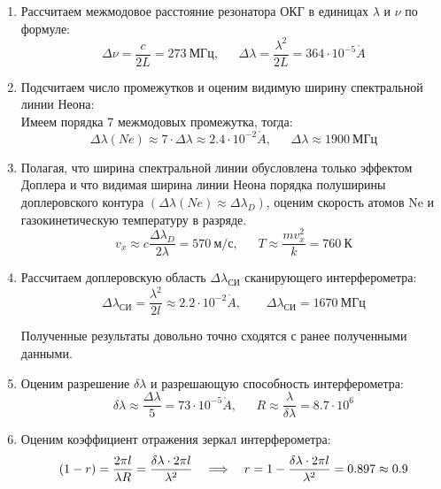 \documentclass{lab}
\renewcommand{\AA}{\ensuremath{\mathring{A}}}
\begin{document}
\begin{enumerate}
\item
Рассчитаем межмодовое расстояние резонатора ОКГ в единицах $ \lambda  $ и $ \nu  $ по формуле:
\begin{equation}
\Delta \nu = \dfrac{c}{2L} = 273~МГц, ~~~~~~~ \Delta \lambda = \dfrac{\lambda^2}{2L} = 364 \cdot 10^{-5} \AA
\end{equation}

\item 
Подсчитаем число промежутков и оценим видимую ширину спектральной линии Неона:\\
Имеем порядка 7 межмодовых промежутка, тогда:
\begin{equation}
\Delta \lambda(Ne) \approx 7 \cdot \Delta \lambda \approx 2.4 \cdot 10^{-2 } \AA, ~~~~~~~ \Delta \lambda \approx 1900 ~МГц
\end{equation}

\item
Полагая, что ширина спектральной линии обусловлена только эффектом Доплера и что видимая ширина линии Неона порядка полуширины доплеровского контура $ (\Delta \lambda (Ne) \approx \Delta \lambda_D) $, оценим скорость атомов Ne и газокинетическую температуру в разряде.
\begin{equation}
v_x \approx c \dfrac{\Delta \lambda_D}{2 \lambda } = 570~м/с, ~~~~~~~ T \approx \dfrac{m v_x^2 }{k} = 760~К
\end{equation}

\item
Рассчитаем доплеровскую область $ \Delta \lambda_{СИ} $ сканирующего интерферометра:
\begin{equation}
\Delta \lambda_{СИ} = \dfrac{\lambda^2 }{2l } \approx 2.2 \cdot 10^{-2} \AA, ~~~~~~~~~ \Delta \lambda_{СИ} = 1670~МГц
\end{equation}

Полученные результаты довольно точно сходятся с ранее полученными данными.

\item 
Оценим разрешение $ \delta \lambda  $ и разрешающую способность интерферометра:
\begin{equation}
\delta \lambda \approx \dfrac{\Delta \lambda}{5} = 	73\cdot 10^{-5} \AA, ~~~~~~~ R \approx \dfrac{\lambda}{\delta \lambda } = 8.7 \cdot 10^6 
\end{equation}

\item 
Оценим коэффициент отражения зеркал интерферометра:
\begin{equation}
(1-r) = \dfrac{2\pi l}{\lambda R} = \dfrac{\delta \lambda \cdot 2 \pi l}{\lambda^2} \quad \Longrightarrow \quad r = 1 - \dfrac{\delta \lambda \cdot 2 \pi l}{\lambda^2} = 0.897 \approx 0.9
\end{equation}

\end{enumerate}
\end{document}
